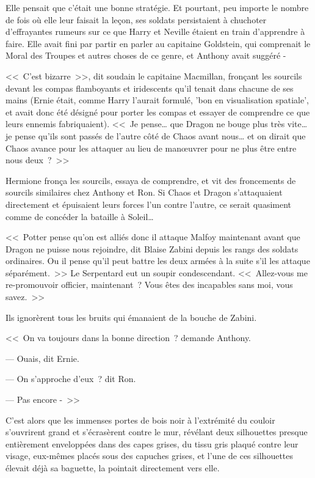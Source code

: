 Elle pensait que c'était une bonne stratégie. Et pourtant, peu importe le nombre de fois où elle leur faisait la leçon, ses soldats persistaient à chuchoter d'effrayantes rumeurs sur ce que Harry et Neville étaient en train d'apprendre à faire. Elle avait fini par partir en parler au capitaine Goldstein, qui comprenait le Moral des Troupes et autres choses de ce genre, et Anthony avait suggéré -

<<~C'est bizarre~>>, dit soudain le capitaine Macmillan, fronçant les sourcils devant les compas flamboyants et iridescents qu'il tenait dans chacune de ses mains (Ernie était, comme Harry l'aurait formulé, 'bon en visualisation spatiale', et avait donc été désigné pour porter les compas et essayer de comprendre ce que leurs ennemis fabriquaient). <<~Je pense… que Dragon ne bouge plus très vite… je pense qu'ils sont passés de l'autre côté de Chaos avant nous… et on dirait que Chaos avance pour les attaquer au lieu de manœuvrer pour ne plus être entre nous deux~?~>>

Hermione fronça les sourcils, essaya de comprendre, et vit des froncements de sourcils similaires chez Anthony et Ron. Si Chaos et Dragon s'attaquaient directement et épuisaient leurs forces l'un contre l'autre, ce serait quasiment comme de concéder la bataille à Soleil…

<<~Potter pense qu'on est alliés donc il attaque Malfoy maintenant avant que Dragon ne puisse nous rejoindre, dit Blaise Zabini depuis les rangs des soldats ordinaires. Ou il pense qu'il peut battre les deux armées à la suite s'il les attaque séparément.~>> Le Serpentard eut un soupir condescendant. <<~Allez-vous me re-promouvoir officier, maintenant~? Vous êtes des incapables sans moi, vous savez.~>>

Ils ignorèrent tous les bruits qui émanaient de la bouche de Zabini.

<<~On va toujours dans la bonne direction~? demande Anthony.

--- Ouais, dit Ernie.

--- On s'approche d'eux~? dit Ron.

--- Pas encore -~>>

C'est alors que les immenses portes de bois noir à l'extrémité du couloir s'ouvrirent grand et s'écrasèrent contre le mur, révélant deux silhouettes presque entièrement enveloppées dans des capes grises, du tissu gris plaqué contre leur visage, eux-mêmes placés sous des capuches grises, et l'une de ces silhouettes élevait déjà sa baguette, la pointait directement vers elle.

